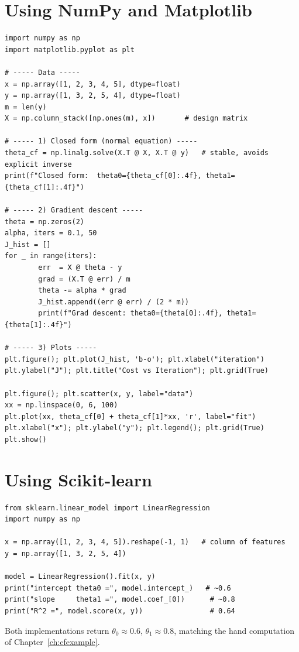 \documentclass[11pt,a4paper]{report}
\theoremstyle{definition}
\theoremstyle{plain}
\theoremstyle{remark}
\begin{document}
	\section{Using NumPy and Matplotlib}
	\begin{lstlisting}[style=python,caption={Closed form and gradient descent with NumPy.}]
import numpy as np
import matplotlib.pyplot as plt

# ----- Data -----
x = np.array([1, 2, 3, 4, 5], dtype=float)
y = np.array([1, 3, 2, 5, 4], dtype=float)
m = len(y)
X = np.column_stack([np.ones(m), x])       # design matrix

# ----- 1) Closed form (normal equation) -----
theta_cf = np.linalg.solve(X.T @ X, X.T @ y)   # stable, avoids explicit inverse
print(f"Closed form:  theta0={theta_cf[0]:.4f}, theta1={theta_cf[1]:.4f}")

# ----- 2) Gradient descent -----
theta = np.zeros(2)
alpha, iters = 0.1, 50
J_hist = []
for _ in range(iters):
		err  = X @ theta - y
		grad = (X.T @ err) / m
		theta -= alpha * grad
		J_hist.append((err @ err) / (2 * m))
		print(f"Grad descent: theta0={theta[0]:.4f}, theta1={theta[1]:.4f}")

# ----- 3) Plots -----
plt.figure(); plt.plot(J_hist, 'b-o'); plt.xlabel("iteration")
plt.ylabel("J"); plt.title("Cost vs Iteration"); plt.grid(True)

plt.figure(); plt.scatter(x, y, label="data")
xx = np.linspace(0, 6, 100)
plt.plot(xx, theta_cf[0] + theta_cf[1]*xx, 'r', label="fit")
plt.xlabel("x"); plt.ylabel("y"); plt.legend(); plt.grid(True)
plt.show()
	\end{lstlisting}
	
	\section{Using Scikit-learn}
	\begin{lstlisting}[style=python,caption={The same fit in three lines with scikit-learn.}]
from sklearn.linear_model import LinearRegression
import numpy as np

x = np.array([1, 2, 3, 4, 5]).reshape(-1, 1)   # column of features
y = np.array([1, 3, 2, 5, 4])

model = LinearRegression().fit(x, y)
print("intercept theta0 =", model.intercept_)   # ~0.6
print("slope     theta1 =", model.coef_[0])      # ~0.8
print("R^2 =", model.score(x, y))                # 0.64
	\end{lstlisting}
	
	Both implementations return $\theta_0\approx0.6$, $\theta_1\approx0.8$, matching
	the hand computation of Chapter~\ref{ch:cfexample}.
	
\end{document}
